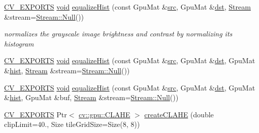 \begin{DoxyCompactItemize}
\item 
\hyperlink{core_2types__c_8h_a1bf9f0e121b54272da02379cfccd0a2b}{C\-V\-\_\-\-E\-X\-P\-O\-R\-T\-S} \hyperlink{legacy_8hpp_a8bb47f092d473522721002c86c13b94e}{void} \hyperlink{namespacecv_1_1gpu_ae6cf6f4fa72af8d992c8b28839037b01}{equalize\-Hist} (const Gpu\-Mat \&\hyperlink{legacy_8hpp_a371cd109b74033bc4366f584edd3dacc}{src}, Gpu\-Mat \&\hyperlink{photo__c_8h_aed13e2a25279b24dc954073233fef7a5}{dst}, \hyperlink{classcv_1_1gpu_1_1Stream}{Stream} \&stream=\hyperlink{classcv_1_1gpu_1_1Stream_af96c23564834f88333dcb8997df553f1}{Stream\-::\-Null}())
\begin{DoxyCompactList}\small\item\em normalizes the grayscale image brightness and contrast by normalizing its histogram \end{DoxyCompactList}\item 
\hyperlink{core_2types__c_8h_a1bf9f0e121b54272da02379cfccd0a2b}{C\-V\-\_\-\-E\-X\-P\-O\-R\-T\-S} \hyperlink{legacy_8hpp_a8bb47f092d473522721002c86c13b94e}{void} \hyperlink{namespacecv_1_1gpu_a814491a45d367af680977dfe5a195341}{equalize\-Hist} (const Gpu\-Mat \&\hyperlink{legacy_8hpp_a371cd109b74033bc4366f584edd3dacc}{src}, Gpu\-Mat \&\hyperlink{photo__c_8h_aed13e2a25279b24dc954073233fef7a5}{dst}, Gpu\-Mat \&\hyperlink{legacy_8hpp_a680f11e53e63640f03dcbb160eb06c53}{hist}, \hyperlink{classcv_1_1gpu_1_1Stream}{Stream} \&stream=\hyperlink{classcv_1_1gpu_1_1Stream_af96c23564834f88333dcb8997df553f1}{Stream\-::\-Null}())
\item 
\hyperlink{core_2types__c_8h_a1bf9f0e121b54272da02379cfccd0a2b}{C\-V\-\_\-\-E\-X\-P\-O\-R\-T\-S} \hyperlink{legacy_8hpp_a8bb47f092d473522721002c86c13b94e}{void} \hyperlink{namespacecv_1_1gpu_a2e769d012158e3a08a2b72b96ed7a83c}{equalize\-Hist} (const Gpu\-Mat \&\hyperlink{legacy_8hpp_a371cd109b74033bc4366f584edd3dacc}{src}, Gpu\-Mat \&\hyperlink{photo__c_8h_aed13e2a25279b24dc954073233fef7a5}{dst}, Gpu\-Mat \&\hyperlink{legacy_8hpp_a680f11e53e63640f03dcbb160eb06c53}{hist}, Gpu\-Mat \&buf, \hyperlink{classcv_1_1gpu_1_1Stream}{Stream} \&stream=\hyperlink{classcv_1_1gpu_1_1Stream_af96c23564834f88333dcb8997df553f1}{Stream\-::\-Null}())
\item 
\hyperlink{core_2types__c_8h_a1bf9f0e121b54272da02379cfccd0a2b}{C\-V\-\_\-\-E\-X\-P\-O\-R\-T\-S} Ptr$<$ \hyperlink{classcv_1_1gpu_1_1CLAHE}{cv\-::gpu\-::\-C\-L\-A\-H\-E} $>$ \hyperlink{namespacecv_1_1gpu_a7d24be31a15926d1b289a1482c1c0602}{create\-C\-L\-A\-H\-E} (double clip\-Limit=40., Size tile\-Grid\-Size=Size(8, 8))
\item 

\end{DoxyCompactItemize}

